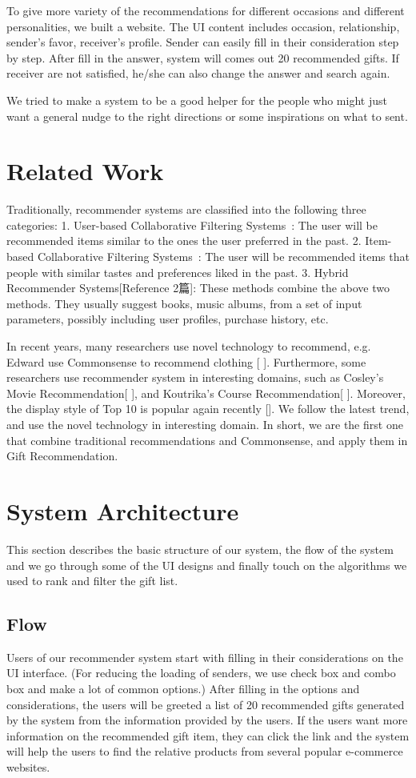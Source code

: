 \documentclass[11pt,twocolumn]{article}
\begin{document}
To give more variety of the recommendations for different occasions and different personalities, we built a website.   The UI content includes occasion, relationship, sender's favor, receiver's profile. 
Sender can easily fill in their consideration step by step. 
After fill in the answer, system will comes out 20 recommended gifts.  If receiver are not satisfied, he/she can also change the answer and search again.

We tried to make a system to be a good helper for the people who might just want a general nudge to the right directions or some inspirations on what to sent.  

\section{Related Work}
Traditionally, recommender systems are classified into the following three categories: 
1. User-based Collaborative Filtering Systems~\cite{Herlocker}:
The user will be recommended items similar to the ones the user preferred in the past.
2. Item-based Collaborative Filtering Systems~\cite{Sarwar, Linden}:
The user will be recommended items that people with similar tastes and preferences liked in the past.
3. Hybrid Recommender Systems[Reference 2篇]:
These methods combine the above two methods.
They usually suggest books, music albums, from a set of input parameters, possibly including user profiles, purchase history, etc.

In recent years, many researchers use novel technology to recommend, e.g. Edward use Commonsense to recommend clothing [ ].   Furthermore, some researchers use recommender system in interesting domains, such as Cosley’s Movie Recommendation[ ], and Koutrika’s Course Recommendation[ ].   Moreover, the display style of Top 10 is popular again recently []. We follow the latest trend, and use the novel technology in interesting domain.   In short, we are the first one that combine traditional recommendations and Commonsense, and apply them in Gift Recommendation.


\section{System Architecture}

This section describes the basic structure of our system, the flow of the system and we go through some of the UI designs and finally touch on the algorithms we used to rank and filter the gift list.

\subsection{Flow}
Users of our recommender system start with filling in their considerations on the UI interface. (For reducing the loading of senders, we use check box and combo box and make a lot of common options.)   
After filling in the options and considerations, the users will be greeted  a list of 20 recommended gifts generated by the system from the information provided by the users.
If the users want more information on the recommended gift item, they can click the link and the system will help the users to find the relative products from several popular e-commerce websites.
\end{document}
